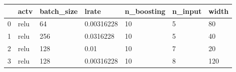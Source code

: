 \begin{tabular}{lllllll}
\toprule
{} &  actv & batch\_size &       lrate & n\_boosting & n\_input & width \\
\midrule
0 &  relu &         64 &  0.00316228 &         10 &       5 &    80 \\
1 &  relu &        256 &   0.0316228 &         10 &       5 &    40 \\
2 &  relu &        128 &        0.01 &         10 &       7 &    20 \\
3 &  relu &        128 &  0.00316228 &         10 &       8 &   120 \\
\bottomrule
\end{tabular}
